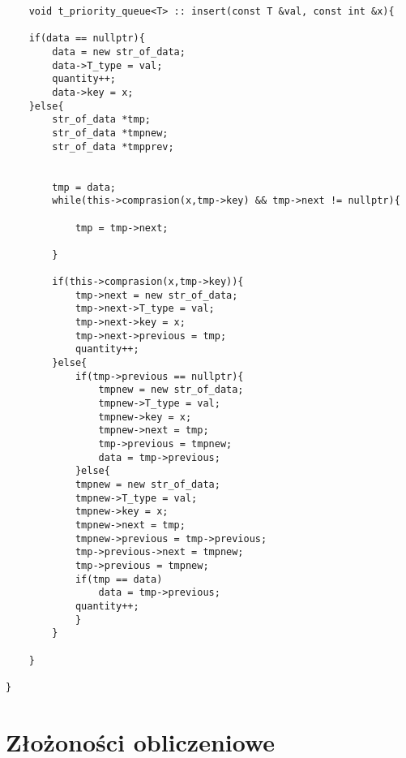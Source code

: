 \documentclass[12pt]{article}
\begin{document}
\begin{lstlisting}
    void t_priority_queue<T> :: insert(const T &val, const int &x){

    if(data == nullptr){
        data = new str_of_data;
        data->T_type = val;
        quantity++;
        data->key = x;
    }else{
        str_of_data *tmp;
        str_of_data *tmpnew;
        str_of_data *tmpprev;
        

        tmp = data;
        while(this->comprasion(x,tmp->key) && tmp->next != nullptr){

            tmp = tmp->next;

        }

        if(this->comprasion(x,tmp->key)){
            tmp->next = new str_of_data;
            tmp->next->T_type = val;
            tmp->next->key = x;
            tmp->next->previous = tmp;
            quantity++;
        }else{
            if(tmp->previous == nullptr){
                tmpnew = new str_of_data;
                tmpnew->T_type = val;
                tmpnew->key = x;
                tmpnew->next = tmp;
                tmp->previous = tmpnew;
                data = tmp->previous;
            }else{
            tmpnew = new str_of_data;
            tmpnew->T_type = val;
            tmpnew->key = x;
            tmpnew->next = tmp;
            tmpnew->previous = tmp->previous;
            tmp->previous->next = tmpnew;
            tmp->previous = tmpnew;
            if(tmp == data)
                data = tmp->previous;
            quantity++;
            }
        }        
        
    }

}
\end{lstlisting}

\section{Złożoności obliczeniowe}
\end{document}
